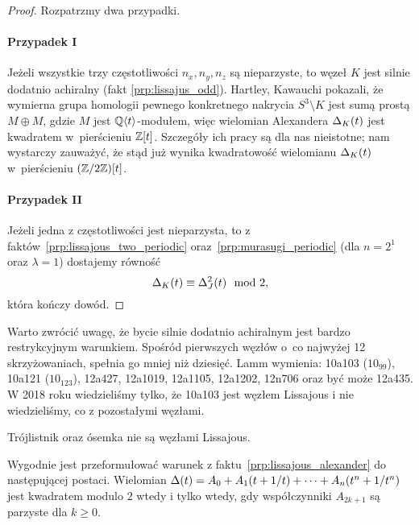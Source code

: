 \begin{proof}
    Rozpatrzmy dwa przypadki.

    \paragraph{Przypadek I}
    Jeżeli wszystkie trzy częstotliwości $n_x, n_y, n_z$ są nieparzyste, to węzeł $K$ jest silnie dodatnio achiralny (fakt \ref{prp:lissajus_odd}).
    Hartley, Kawauchi \cite{hartley1979} pokazali, że wymierna grupa homologii pewnego konkretnego nakrycia $S^3 \setminus K$ jest sumą prostą $M \oplus M$, gdzie $M$ jest $\mathbb Q\langle t \rangle$-modułem, więc wielomian Alexandera $\Delta_K(t)$ jest kwadratem w~pierścieniu $\mathbb Z[t]$.
    Szczegóły ich pracy są dla nas nieistotne; nam wystarczy zauważyć, że stąd już wynika kwadratowość wielomianu $\Delta_K(t)$ w~pierścieniu $(\mathbb Z/2\mathbb Z)[t]$.

    \paragraph{Przypadek II}
    Jeżeli jedna z częstotliwości jest nieparzysta, to z faktów~\ref{prp:lissajous_two_periodic} oraz~\ref{prp:murasugi_periodic} (dla $n=2^1$ oraz $\lambda = 1$) dostajemy równość
    \begin{equation}
\label{eqn:lissajous_squared}%
        \alexander_K(t) \equiv \alexander^2_{J}(t) \mod 2,
    \end{equation}
    która kończy dowód.
\end{proof}

Warto zwrócić uwagę, że bycie silnie dodatnio achiralnym jest bardzo restrykcyjnym warunkiem.
Spośród pierwszych węzłów o~co najwyżej 12 skrzyżowaniach, spełnia go mniej niż dziesięć.
Lamm \cite{lamm2021} wymienia: 10a103 ($10_{99}$), 10a121 ($10_{123}$), 12a427, 12a1019, 12a1105, 12a1202, 12n706 oraz być może 12a435.
%
%
%
%
%
%
%
%
%
%
W 2018 roku wiedzieliśmy tylko, że 10a103 jest węzłem Lissajous i nie wiedzieliśmy, co z pozostałymi węzłami.

\begin{example}
    Trójlistnik oraz ósemka nie są węzłami Lissajous.
\end{example}

Wygodnie jest przeformułować warunek z faktu~\ref{prp:lissajous_alexander} do następującej postaci.
Wielomian $\Delta(t) = A_0 + A_1(t+1/t) + \cdots + A_n(t^n + 1/t^n)$ jest kwadratem modulo $2$ wtedy i tylko wtedy, gdy współczynniki $A_{2k+1}$ są parzyste dla $k \ge 0$.

